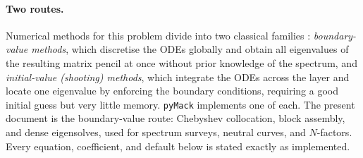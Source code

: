 \documentclass[11pt]{article}
\begin{document}
\paragraph{Two routes.} Numerical methods for this problem divide into two classical families
\cite{malik1990}: \emph{boundary-value methods}, which discretise the ODEs globally and obtain all
eigenvalues of the resulting matrix pencil at once without prior knowledge of the spectrum, and
\emph{initial-value (shooting) methods}, which integrate the ODEs across the layer and locate one
eigenvalue by enforcing the boundary conditions, requiring a good initial guess but very little
memory. \texttt{pyMack} implements one of each. The present document is the boundary-value route:
Chebyshev collocation, block assembly, and dense eigensolves, used for spectrum surveys, neutral
curves, and $N$-factors. Every equation, coefficient, and default below is stated exactly as
implemented.
\end{document}
